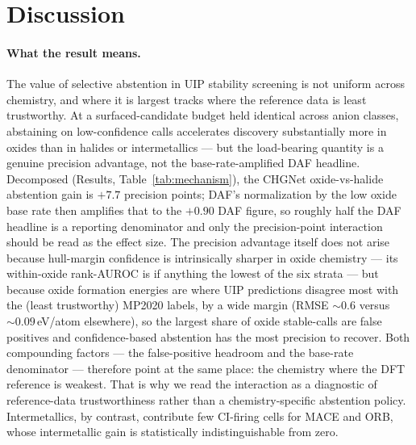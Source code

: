 \documentclass[11pt]{article}
\begin{document}
\section{Discussion}

\paragraph{What the result means.} The value of selective abstention in UIP stability
screening is not uniform across chemistry, and where it is largest tracks where the reference
data is least trustworthy. At a surfaced-candidate budget held identical across
anion classes, abstaining on low-confidence calls accelerates discovery substantially more
in oxides than in halides or intermetallics --- but the load-bearing quantity is a genuine
precision advantage, not the base-rate-amplified DAF headline. Decomposed (Results,
Table~\ref{tab:mechanism}), the CHGNet oxide-vs-halide abstention gain is $+7.7$ precision
points; DAF's normalization by the low oxide base rate then amplifies that to the $+0.90$ DAF
figure, so roughly half the DAF headline is a reporting denominator and only the precision-point
interaction should be read as the effect size. The precision advantage itself does not arise
because hull-margin confidence is intrinsically sharper in oxide chemistry --- its within-oxide
rank-AUROC is if anything the lowest of the six strata --- but because oxide formation energies
are where UIP predictions disagree most with the (least trustworthy) MP2020 labels, by a wide
margin (RMSE $\sim\!0.6$ versus $\sim\!0.09$\,eV/atom elsewhere), so the largest share of oxide
stable-calls are false positives and confidence-based abstention has the most precision to
recover. Both compounding factors --- the false-positive headroom and the base-rate denominator
--- therefore point at the same place: the chemistry where the DFT reference is weakest. That is
why we read the interaction as a diagnostic of reference-data trustworthiness rather than a
chemistry-specific abstention policy. Intermetallics, by
contrast, contribute few CI-firing cells for MACE and ORB, whose intermetallic gain is
statistically indistinguishable from zero.
\end{document}
